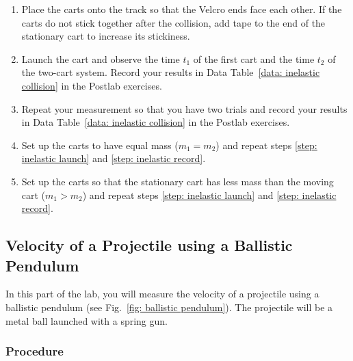 \documentclass[addpoints]{physlabs}
\begin{document}
\begin{labsection}
\begin{experiment}
\begin{enumerate}
        \item Place the carts onto the track so that the Velcro ends face each other. If the carts do not stick together after the collision, add tape to the end of the stationary cart to increase its stickiness.

        \item Launch the cart and observe the time $t_1$ of the first cart and the time $t_2$ of the two-cart system. Record your results in Data Table~\ref{data: inelastic collision} in the Postlab exercises. \label{step: inelastic launch}

        \item Repeat your measurement so that you have two trials and record your results in Data Table~\ref{data: inelastic collision} in the Postlab exercises. \label{step: inelastic record}

        \item Set up the carts to have equal mass ($m_1=m_2$) and repeat steps \ref{step: inelastic launch} and \ref{step: inelastic record}.

        \item Set up the carts so that the stationary cart has less mass than the moving cart ($m_1>m_2$) and repeat steps \ref{step: inelastic launch} and \ref{step: inelastic record}.
    \end{enumerate}   

    \subsection*{Velocity of a Projectile using a Ballistic Pendulum}

    In this part of the lab, you will measure the velocity of a projectile using a ballistic pendulum (see Fig.~\ref{fig: ballistic pendulum}). The projectile will be a metal ball launched with a spring gun.\\[1em]

    \setlength{\fboxsep}{6pt}%
    \setlength{\fboxrule}{2pt}%

    \subsubsection*{Procedure}


\end{experiment}
\end{labsection}
\end{document}
